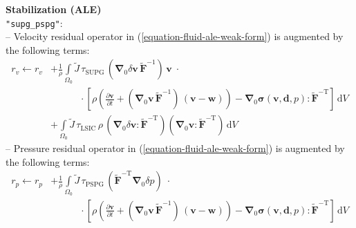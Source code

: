 \documentclass[a4paper,12pt]{report}
\newcommand{\bs}[1]{\boldsymbol{#1}}
\newcommand{\Om}{\mathit{\Omega}}
\begin{document}
\textbf{Stabilization (ALE)}\\

\verb."supg_pspg".:\\
-- Velocity residual operator in (\ref{equation-fluid-ale-weak-form}) is augmented by the following terms:
\begin{equation}
\begin{aligned}
r_v \leftarrow r_v &+ \frac{1}{\rho}\int\limits_{\Om_0}\widetilde{J}\, \tau_{\mathrm{SUPG}}\,(\bs{\nabla}_0\delta\bs{v}\,\widetilde{\bs{F}}^{-1})\,\bs{v}\;\cdot \\
& \qquad\quad \cdot\left[\rho\left(\frac{\partial \bs{v}}{\partial t} + (\bs{\nabla}_0\bs{v}\,\widetilde{\bs{F}}^{-1})\,(\bs{v}-\bs{w})\right) - \bs{\nabla}_{0} \bs{\sigma}(\bs{v},\bs{d},p) : \widetilde{\bs{F}}^{-\mathrm{T}}\right]\,\mathrm{d}V \\
& + \int\limits_{\Om_0}\widetilde{J}\, \tau_{\mathrm{LSIC}}\,\rho\,(\bs{\nabla}_{0}\delta\bs{v} : \widetilde{\bs{F}}^{-\mathrm{T}})(\bs{\nabla}_{0}\bs{v} : \widetilde{\bs{F}}^{-\mathrm{T}})\,\mathrm{d}V
\end{aligned}
\end{equation}
-- Pressure residual operator in (\ref{equation-fluid-ale-weak-form}) is augmented by the following terms:
\begin{equation}
\begin{aligned}
r_p \leftarrow r_p &+ \frac{1}{\rho}\int\limits_{\Om_0}\widetilde{J}\, \tau_{\mathrm{PSPG}}\,(\widetilde{\bs{F}}^{-\mathrm{T}}\bs{\nabla}_{0}\delta p) \;\cdot \\
& \qquad\quad \cdot \left[\rho\left(\frac{\partial \bs{v}}{\partial t} + (\bs{\nabla}_0\bs{v}\,\widetilde{\bs{F}}^{-1})\,(\bs{v}-\bs{w})\right) - \bs{\nabla}_{0} \bs{\sigma}(\bs{v},\bs{d},p) : \widetilde{\bs{F}}^{-\mathrm{T}}\right]\,\mathrm{d}V
\end{aligned}
\end{equation}
\end{document}
